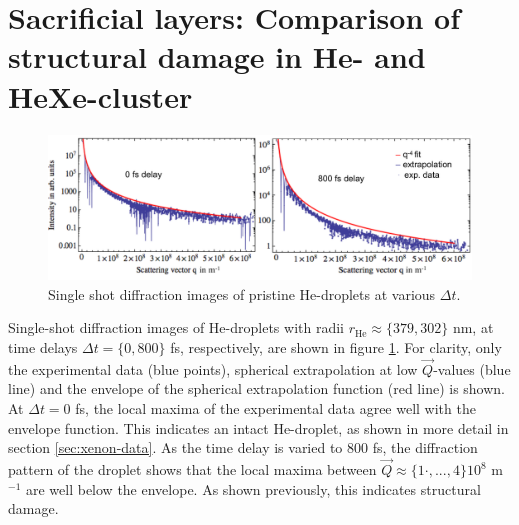 \section{Sacrificial layers: Comparison of structural damage in He- and HeXe-cluster}\label{sec:comparison-of-He-and-HeXe-cluster}
\begin{figure}
	\centering
		\includegraphics[width=1.00\textwidth]{images/results/He-diffraction-patterns.pdf}
	\caption[Single-shot diffraction images of He-droplets at different time delays]{Single shot diffraction images of pristine He-droplets at various $\Delta t$.}
	\label{fig:He-diffraction-patterns}
\end{figure}
Single-shot diffraction images of He-droplets with radii $r_{\text{He}}\approx\{379, 302\}$ nm, at time delays $\Delta t=\{0, 800\}$ fs, respectively, are shown in figure \ref{fig:He-diffraction-patterns}. For clarity, only the experimental data (blue points), spherical extrapolation at low $\vec{Q}$-values (blue line) and the envelope of the spherical extrapolation function (red line) is shown. At $\Delta t = 0$ fs, the local maxima of the experimental data agree well with the envelope function. This indicates an intact He-droplet, as shown in more detail in section \ref{sec:xenon-data}. As the time delay is varied to $800$ fs, the diffraction pattern of the droplet shows that the local maxima between $\vec{Q} \approx \{1\cdot,...,4\}10^{8}$ m$^{-1}$ are well below the envelope. As shown previously, this indicates structural damage.\\
